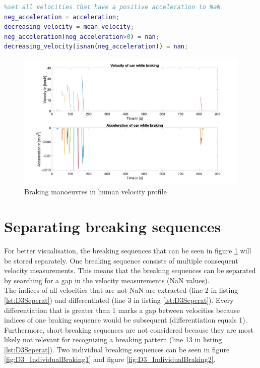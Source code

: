 \begin{lstlisting}[language=Matlab,basicstyle=\scriptsize	,caption= Extracting negative acceleration,label= lst:D3Extract]
%search for negative acceleration and set positive acceleration to NaN
%set all velocities that have a positive acceleration to NaN
neg_acceleration = acceleration;
decreasing_velocity = mean_velocity;
neg_acceleration(neg_acceleration>0) = nan;
decreasing_velocity(isnan(neg_acceleration)) = nan;
\end{lstlisting}

\begin{figure}[H]
\centering
\includegraphics[width=1\textwidth]{images/D3_individual_braking.jpg}
\caption{Braking manoeuvres in human velocity profile}
\label{fig:D3_IndividualBraking}
\end{figure}


\section{Separating breaking sequences}
For better visualisation, the breaking sequences that can be seen in figure \ref{fig:D3_IndividualBraking} will be stored separately.
One breaking sequence consists of multiple consequent velocity measurements.
This means that the breaking sequences can be separated by searching for a gap in the velocity measurements (\ac{NaN} values). \\
The indices of all velocities that are not \ac{NaN} are extracted (line 2 in listing \ref{lst:D3Seperat}) and differentiated (line 3 in listing \ref{lst:D3Seperat}).
Every differentiation that is greater than 1 marks a gap between velocities because indices of one braking sequence would be subsequent (differentiation equals 1).
Furthermore, short breaking sequences are not considered because they are most likely not relevant for recognizing a breaking pattern (line 13 in listing \ref{lst:D3Seperat}).
Two individual breaking sequences can be seen in figure \ref{fig:D3_IndividualBraking1} and figure \ref{fig:D3_IndividualBraking2}.

